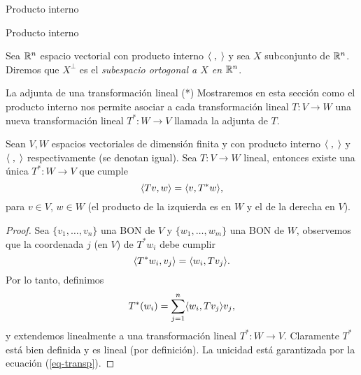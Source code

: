 \begin{chapter}{Producto interno}
\begin{section}{Producto interno}
        \begin{definicion}
            Sea $\mathbb R^n$ espacio vectorial con producto interno $\langle \;,\;\rangle$ y sea $X$ subconjunto de $\mathbb R^n$. Diremos que $X^\perp$ es el  \textit{subespacio  ortogonal a $X$ en $\mathbb R^n$}.   
        \end{definicion}
        
    
    \end{section}


    

    \begin{section}{La adjunta de una transformaci\'on lineal (*)}\label{seccion-adjunta-de-una-transformacion-lineal} Mostraremos en esta sección como el producto interno nos permite asociar a cada transformación lineal $T: V \to W$ una nueva transformación  lineal $T^*: W \to V$ llamada la adjunta de $T$. 
	
	
	
        \begin{teorema}
            Sean $V, W$ espacios vectoriales de dimensión finita y con producto interno $\langle \;,\;\rangle$ y $\langle \;,\;\rangle$ respectivamente (se denotan igual). Sea $T: V \to W$ lineal, entonces existe una única $T^*: W \to V$ que cumple
            \begin{equation}\label{eq-adjunta}
            \langle Tv,w\rangle = \langle v,T^*w\rangle,
            \end{equation}  
            para $v\in V$, $w \in W$ (el producto de la izquierda es en $W$ y el de la derecha en $V$).
        \end{teorema}
        \begin{proof}
        Sea $\{v_1,\ldots,v_n\}$ una BON de $V$ y $\{w_1,\ldots,w_m\}$ una BON de $W$, observemos que la coordenada $j$ (en $V$) de $T^*w_i$ debe cumplir
        \begin{equation}\label{eq-transp}
            \langle T^*w_i,v_j\rangle = 	\langle w_i,Tv_j\rangle.
        \end{equation}
        Por lo tanto,  definimos
        \begin{equation*}
            T^*(w_i) = \sum_{j=1}^{n} \langle w_i,Tv_j\rangle v_j,
        \end{equation*}
        y extendemos linealmente a una transformación lineal $T^*: W \to V$. Claramente $T^*$   está bien definida y es lineal (por definición).  La unicidad está garantizada por la ecuación (\ref{eq-transp}).  
        

\end{proof}
\end{section}
\end{chapter}
